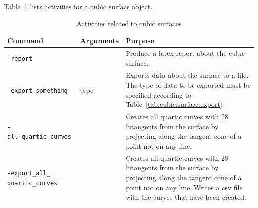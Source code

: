 Table~\ref{tab:cubic:surface:activities} lists activities for a cubic surface object.
\begin{table}
\begin{center}
\begin{tabular}{|p{4cm}|p{3cm}|p{8cm}|}
\hline
Command & Arguments & Purpose \\
\hline
\hline
\verb'-report' & & Produce a latex report about the cubic surface. \\
\hline
\verb'-export_something' & type & Exports data about the surface to a file. The type of data to be exported must be specified according to Table~\ref{tab:cubic:surface:export}. \\
\hline
\verb'-all_quartic_curves' & & Creates all quartic curves with 28 bitangents from the surface by projecting along the tangent cone of a point not on any line.   \\
\hline
\verb'-export_all_' \verb'quartic_curves' & & Creates all quartic curves with 28 bitangents from the surface by projecting along the tangent cone of a point not on any line. Writes a csv file with the curves that have been created.  \\
\hline
\end{tabular}
\end{center}
\caption{\label{tab:cubic:surface:activities}Activities related to cubic surfaces}
\end{table}

